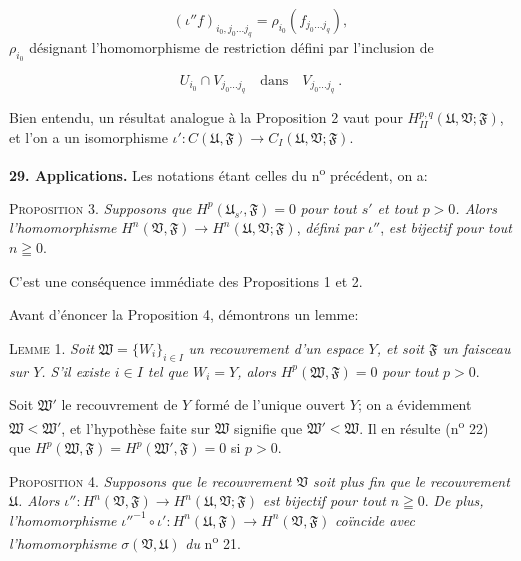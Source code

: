 \begin{equation*}
(\iota'' f)_{i_0 , j_0 \ldots j_q} = \rho_{i_0}(f_{j_0 \ldots j_q}),
\end{equation*}
$\rho_{i_0}$ désignant l'homomorphisme de restriction défini par l'inclusion de

\begin{equation*}
U_{i_0} \cap V_{j_0 \ldots j_q} \quad \text{dans} \quad V_{j_0 \ldots j_q} \ .
\end{equation*}

Bien entendu, un résultat analogue à la Proposition 2 vaut pour $H_{II}^{p,q}(\mathfrak{U}, \mathfrak{V}; \mathfrak{F})$, et l'on a un isomorphisme $\iota': C(\mathfrak{U}, \mathfrak{F}) \rightarrow C_I(\mathfrak{U}, \mathfrak{V}; \mathfrak{F})$.

\textbf{29. Applications.} Les notations étant celles du n\textsuperscript{o} précédent, on a:

\textsc{Proposition} 3. \textit{Supposons que} $H^p(\mathfrak{U}_{s'} , \mathfrak{F}) = 0$ \textit{pour tout $s'$ et tout $p > 0$. Alors l'homomorphisme} $H^n(\mathfrak{V}, \mathfrak{F}) \rightarrow H^n(\mathfrak{U}, \mathfrak{V}; \mathfrak{F})$, \textit{défini par} $\iota''$, \textit{est bijectif pour tout} $n \geqq 0$.

C'est une conséquence immédiate des Propositions 1 et 2.

Avant d'énoncer la Proposition 4, démontrons un lemme:

\textsc{Lemme} 1. \textit{Soit} $\mathfrak{W} = \{W_i\}_{i \in I}$ \textit{un recouvrement d'un espace $Y$, et soit $\mathfrak{F}$ un faisceau sur $Y$. S'il existe $i \in I$ tel que $W_i = Y$, alors} $H^p(\mathfrak{W}, \mathfrak{F}) = 0$ \textit{pour tout} $p > 0$.

Soit $\mathfrak{W}'$ le recouvrement de $Y$ formé de l'unique ouvert $Y$; on a évidemment $\mathfrak{W} < \mathfrak{W}'$, et l'hypothèse faite sur $\mathfrak{W}$ signifie que $\mathfrak{W}' < \mathfrak{W}$. Il en résulte (n\textsuperscript{o} 22) que $H^p(\mathfrak{W}, \mathfrak{F}) = H^p(\mathfrak{W}', \mathfrak{F}) = 0$ si $p > 0$.

\textsc{Proposition} 4. \textit{Supposons que le recouvrement $\mathfrak{V}$ soit plus fin que le recouvrement $\mathfrak{U}$. Alors} $\iota'': H^n(\mathfrak{V}, \mathfrak{F}) \rightarrow H^n(\mathfrak{U}, \mathfrak{V}; \mathfrak{F})$ \textit{est bijectif pour tout} $n \geqq 0$. \textit{De plus, l'homomorphisme} $\iota''^{-1} \circ \iota': H^n(\mathfrak{U}, \mathfrak{F}) \rightarrow H^n(\mathfrak{V}, \mathfrak{F})$ \textit{coïncide avec l'homomorphisme} $\sigma(\mathfrak{V}, \mathfrak{U})$ \textit{du} n\textsuperscript{o} 21.


